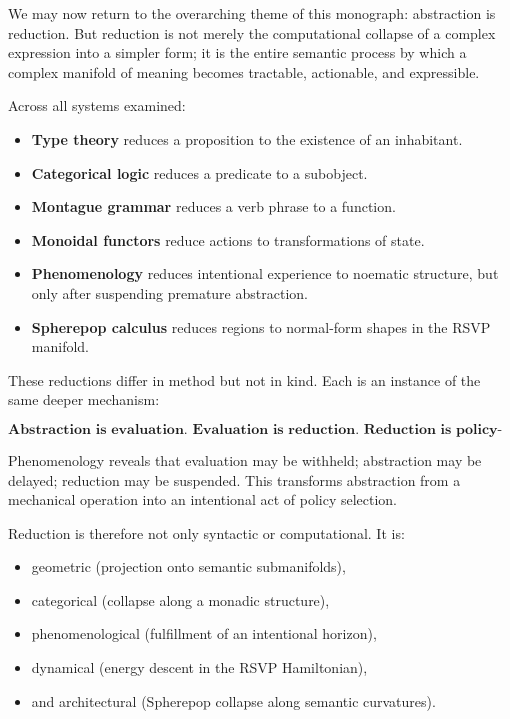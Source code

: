 \documentclass[12pt,letterpaper]{article}
\begin{document}
We may now return to the overarching theme of this monograph: abstraction is
reduction.  But reduction is not merely the computational collapse of a complex
expression into a simpler form; it is the entire semantic process by which a
complex manifold of meaning becomes tractable, actionable, and expressible.

Across all systems examined:

\begin{itemize}
    \item \textbf{Type theory} reduces a proposition to the existence of an
    inhabitant.
    \item \textbf{Categorical logic} reduces a predicate to a subobject.
    \item \textbf{Montague grammar} reduces a verb phrase to a function.
    \item \textbf{Monoidal functors} reduce actions to transformations of state.
    \item \textbf{Phenomenology} reduces intentional experience to noematic
    structure, but only after suspending premature abstraction.
    \item \textbf{Spherepop calculus} reduces regions to normal-form shapes in
    the RSVP manifold.
\end{itemize}

These reductions differ in method but not in kind.  Each is an instance of the
same deeper mechanism:

\[
\boxed{
\textbf{Abstraction is evaluation.  
Evaluation is reduction.  
Reduction is policy-governed semantic flow.}
}
\]

Phenomenology reveals that evaluation may be withheld; abstraction may be
delayed; reduction may be suspended.  This transforms abstraction from a
mechanical operation into an intentional act of policy selection.  

Reduction is therefore not only syntactic or computational.  It is:

\begin{itemize}
    \item geometric (projection onto semantic submanifolds),
    \item categorical (collapse along a monadic structure),
    \item phenomenological (fulfillment of an intentional horizon),
    \item dynamical (energy descent in the RSVP Hamiltonian),
    \item and architectural (Spherepop collapse along semantic curvatures).
\end{itemize}
\end{document}
